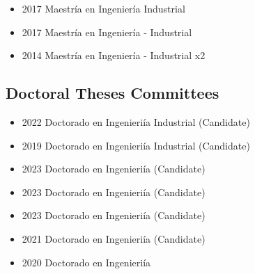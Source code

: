 {\begin{itemize}
    \item 2017 Maestr\'ia en Ingenier\'ia Industrial
\end{itemize}
}

{\begin{itemize}
    \item 2017 Maestr\'ia en Ingenier\'ia - Industrial
\end{itemize}
}

{\begin{itemize}
    \item 2014 Maestr\'ia en Ingenier\'ia - Industrial x2
\end{itemize}
}

\clearpage

\subsection{Doctoral Theses Committees}

{\begin{itemize}
    \item 2022 Doctorado en Ingenieri\'ia Industrial (Candidate)
    \item 2019 Doctorado en Ingenieri\'ia Industrial (Candidate)
\end{itemize}
}

{\begin{itemize}
    \item 2023 Doctorado en Ingenieri\'ia (Candidate)
\end{itemize}
}

{\begin{itemize}
    \item 2023 Doctorado en Ingenieri\'ia (Candidate)
\end{itemize}
}

{\begin{itemize}
    \item 2023 Doctorado en Ingenieri\'ia (Candidate)
    \item 2021 Doctorado en Ingenieri\'ia (Candidate)
    \item 2020 Doctorado en Ingenieri\'ia
\end{itemize}
}

